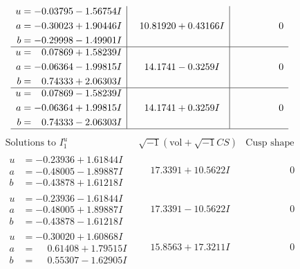 \documentclass[1p]{elsarticle_modified}
\theoremstyle{definition}
\newcommand{\I}{\sqrt{-1}}
\begin{document}
$$\begin{array}{c|c|c}
\begin{aligned}
u &= -0.03795 - 1.56754 I \\
a &= -0.30023 + 1.90446 I \\
b &= -0.29998 - 1.49901 I\end{aligned}
 & \phantom{-}10.81920 + 0.43166 I & \phantom{-0.000000 } 0 \\ \hline\begin{aligned}
u &= \phantom{-}0.07869 + 1.58239 I \\
a &= -0.06364 - 1.99815 I \\
b &= \phantom{-}0.74333 + 2.06303 I\end{aligned}
 & \phantom{-}14.1741 - 0.3259 I & \phantom{-0.000000 } 0 \\ \hline\begin{aligned}
u &= \phantom{-}0.07869 - 1.58239 I \\
a &= -0.06364 + 1.99815 I \\
b &= \phantom{-}0.74333 - 2.06303 I\end{aligned}
 & \phantom{-}14.1741 + 0.3259 I & \phantom{-0.000000 } 0\\
 \hline 
 \end{array}$$\newpage$$\begin{array}{c|c|c}  
\text{Solutions to }I^u_{1}& \I (\text{vol} + \sqrt{-1}CS) & \text{Cusp shape}\\
 \hline 
\begin{aligned}
u &= -0.23936 + 1.61844 I \\
a &= -0.48005 - 1.89887 I \\
b &= -0.43878 + 1.61218 I\end{aligned}
 & \phantom{-}17.3391 + 10.5622 I & \phantom{-0.000000 } 0 \\ \hline\begin{aligned}
u &= -0.23936 - 1.61844 I \\
a &= -0.48005 + 1.89887 I \\
b &= -0.43878 - 1.61218 I\end{aligned}
 & \phantom{-}17.3391 - 10.5622 I & \phantom{-0.000000 } 0 \\ \hline\begin{aligned}
u &= -0.30020 + 1.60868 I \\
a &= \phantom{-}0.61408 + 1.79515 I \\
b &= \phantom{-}0.55307 - 1.62905 I\end{aligned}
 & \phantom{-}15.8563 + 17.3211 I & \phantom{-0.000000 } 0 \\ \hline\begin{aligned}

\end{aligned}
\end{array}$$
\end{document}
